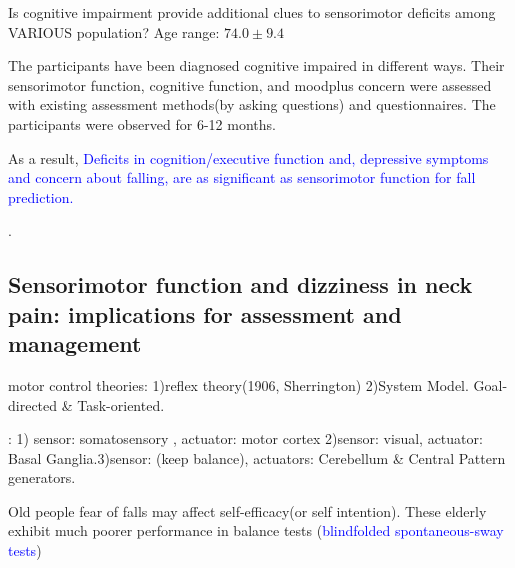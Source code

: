 \documentclass{article}
\begin{document}
Is cognitive impairment provide additional clues to sensorimotor deficits among VARIOUS population? Age range: $74.0 \pm 9.4$

The participants have been diagnosed cognitive impaired in different ways. Their sensorimotor function, cognitive function, and moodplus concern were assessed with existing assessment methods(by asking questions) and questionnaires. The participants were observed for 6-12 months.

As a result, \textcolor{blue}{Deficits in cognition/executive function and, depressive symptoms and concern about falling, are as significant as sensorimotor function for fall prediction.}

\cite{van_Schooten_2020}.
\subsection{Sensorimotor function and dizziness in neck pain: implications for assessment and management}

\begin{comment}
\begin{description}[font=$\bullet$~\normalfont\textbf]
\item [Bananas] yellow and banana shaped
\item [Apples] red and round
\item [Oranges] orange and round
\item [Lemons] yellow, kinda round
\end{description}
\end{comment}

\begin{description}[font=$\bullet$~\normalfont\textbf]
\item [Motor-control properties:]
motor control theories: 1)reflex theory(1906, Sherrington) 2)System Model. Goal-directed \& Task-oriented. 
\item [Systems involves in motor control]: 1) sensor: somatosensory , actuator: motor cortex 2)sensor: visual, actuator: Basal Ganglia.3)sensor: (keep balance), actuators: Cerebellum \& 	Central Pattern generators. 
\item [Fall-related concerns] Old people fear of falls may affect self-efficacy(or self intention). These elderly exhibit much poorer performance in balance tests \cite{Maki_1991} (\textcolor{blue}{blindfolded spontaneous-sway tests})
\end{description}
\end{document}
